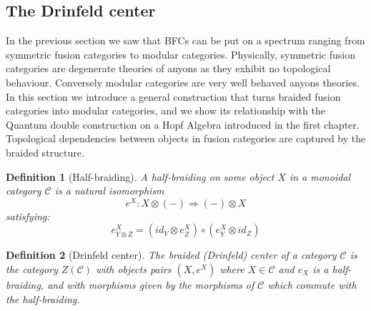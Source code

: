 \documentclass{article}
\newtheorem{definition}{Definition}
\newcommand{\cat}{\mathcal{C}}
\begin{document}
\subsection{The Drinfeld center}
In the previous section we saw that BFCs can be put on a spectrum ranging from symmetric fusion categories to modular categories. Physically, symmetric fusion categories are degenerate theories of anyons as they exhibit no topological behaviour. Conversely modular categories are very well behaved anyons theories.  In this section we introduce a general construction that turns braided fusion categories into modular categories, and we show its relationship with the Quantum double construction on a Hopf Algebra introduced in the first chapter.\\
Topological dependencies between objects in fusion categories are captured by the braided structure.
\begin{definition}[Half-braiding]
	A half-braiding on some object $X$ in a monoidal category $\cat$ is a natural isomorphism 
	$$ e^X : X \otimes (-) \Rightarrow (-) \otimes X$$
	satisfying: 
	$$e^X_{Y \otimes Z} =(id_Y \otimes e^X_Z) \circ (e^X_Y \otimes id_Z)$$ 
\end{definition}
\begin{definition}[Drinfeld center]
	The braided (Drinfeld) center of a category $\mathcal{C}$ is the category $Z(\mathcal{C})$ with objects pairs $(X,e^X)$ where $X \in \mathcal{C}$ and $e_X$ is a half-braiding, and with morphisms given by the morphisms of $\mathcal{C}$ which commute with the half-braiding.
\end{definition}
\end{document}
